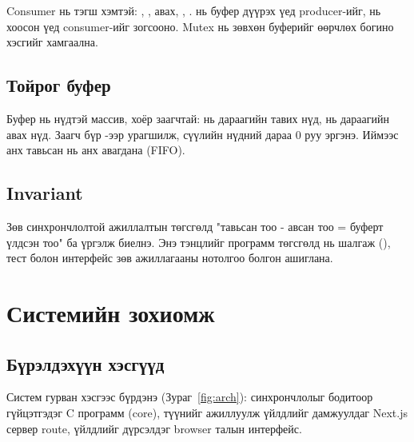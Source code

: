 \documentclass[12pt,a4paper]{article}
\begin{document}
Consumer нь тэгш хэмтэй: , , авах, , .  нь буфер дүүрэх үед producer-ийг,  нь хоосон үед consumer-ийг зогсооно. Mutex нь зөвхөн буферийг өөрчлөх богино хэсгийг хамгаална.

\subsection{Тойрог буфер}
Буфер нь  нүдтэй массив, хоёр заагчтай:  нь дараагийн тавих нүд,  нь дараагийн авах нүд. Заагч бүр -ээр урагшилж, сүүлийн нүдний дараа 0 руу эргэнэ. Иймээс анх тавьсан нь анх авагдана (FIFO).

\subsection{Invariant}
Зөв синхрончлолтой ажиллалтын төгсгөлд "тавьсан тоо - авсан тоо = буферт үлдсэн тоо" ба  үргэлж биелнэ. Энэ тэнцлийг программ төгсгөлд нь шалгаж (), тест болон интерфейс зөв ажиллагааны нотолгоо болгон ашиглана.

\section{Системийн зохиомж}

\subsection{Бүрэлдэхүүн хэсгүүд}
Систем гурван хэсгээс бүрдэнэ (Зураг~\ref{fig:arch}): синхрончлолыг бодитоор гүйцэтгэдэг C программ (core), түүнийг ажиллуулж үйлдлийг дамжуулдаг Next.js сервер route, үйлдлийг дүрсэлдэг browser талын интерфейс.
\end{document}

